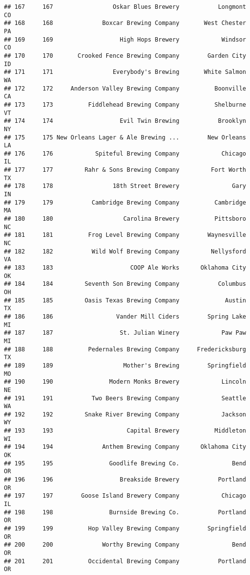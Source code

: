 \documentclass[
]{article}
\begin{document}
\begin{verbatim}
## 167     167                 Oskar Blues Brewery           Longmont    CO
## 168     168              Boxcar Brewing Company       West Chester    PA
## 169     169                   High Hops Brewery            Windsor    CO
## 170     170       Crooked Fence Brewing Company        Garden City    ID
## 171     171                 Everybody's Brewing       White Salmon    WA
## 172     172     Anderson Valley Brewing Company          Boonville    CA
## 173     173          Fiddlehead Brewing Company          Shelburne    VT
## 174     174                   Evil Twin Brewing           Brooklyn    NY
## 175     175 New Orleans Lager & Ale Brewing ...        New Orleans    LA
## 176     176            Spiteful Brewing Company            Chicago    IL
## 177     177         Rahr & Sons Brewing Company         Fort Worth    TX
## 178     178                 18th Street Brewery               Gary    IN
## 179     179           Cambridge Brewing Company          Cambridge    MA
## 180     180                    Carolina Brewery          Pittsboro    NC
## 181     181          Frog Level Brewing Company        Waynesville    NC
## 182     182           Wild Wolf Brewing Company         Nellysford    VA
## 183     183                      COOP Ale Works      Oklahoma City    OK
## 184     184         Seventh Son Brewing Company           Columbus    OH
## 185     185         Oasis Texas Brewing Company             Austin    TX
## 186     186                  Vander Mill Ciders        Spring Lake    MI
## 187     187                   St. Julian Winery            Paw Paw    MI
## 188     188          Pedernales Brewing Company     Fredericksburg    TX
## 189     189                    Mother's Brewing        Springfield    MO
## 190     190                Modern Monks Brewery            Lincoln    NE
## 191     191           Two Beers Brewing Company            Seattle    WA
## 192     192         Snake River Brewing Company            Jackson    WY
## 193     193                     Capital Brewery          Middleton    WI
## 194     194              Anthem Brewing Company      Oklahoma City    OK
## 195     195                Goodlife Brewing Co.               Bend    OR
## 196     196                   Breakside Brewery           Portland    OR
## 197     197        Goose Island Brewery Company            Chicago    IL
## 198     198                Burnside Brewing Co.           Portland    OR
## 199     199          Hop Valley Brewing Company        Springfield    OR
## 200     200              Worthy Brewing Company               Bend    OR
## 201     201          Occidental Brewing Company           Portland    OR

\end{verbatim}
\end{document}
